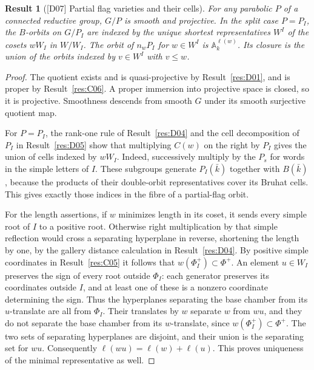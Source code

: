 \documentclass[11pt,a4paper,openany,oneside]{book}
\theoremstyle{resultstyle}
\newtheorem{statement}{Result}[chapter]
\newenvironment{result}[2]{\clubpenalty=10000\begin{statement}[\textnormal{[#1]} #2]\leavevmode\label{res:#1}\ignorespaces}{\end{statement}}
\theoremstyle{definition}
\numberwithin{equation}{chapter}
\begin{document}
\begin{result}{D07}{Partial flag varieties and their cells}
For any parabolic \(P\) of a connected reductive group, \(G/P\) is smooth and projective. In the split case \(P=P_I\), the \(B\)-orbits on \(G/P_I\) are indexed by the unique shortest representatives \(W^I\) of the cosets \(wW_I\) in \(W/W_I\). The orbit of \(n_wP_I\) for \(w\in W^I\) is \(\mathbb A_k^{\ell(w)}\). Its closure is the union of the orbits indexed by \(v\in W^I\) with \(v\le w\).
\end{result}

\begin{proof}
The quotient exists and is quasi-projective by
Result~\ref{res:D01}, and is proper by Result~\ref{res:C06}.
A proper immersion into projective space is closed, so it is
projective. Smoothness descends from smooth \(G\) under its
smooth surjective quotient map.

For \(P=P_I\), the rank-one rule of Result~\ref{res:D04}
and the cell decomposition of \(P_I\) in Result~\ref{res:D05}
show that multiplying \(C(w)\) on the right by \(P_I\)
gives the union of cells indexed by \(wW_I\).
Indeed, successively multiply by the \(P_s\) for words in
the simple letters of \(I\). These subgroups generate
\(P_I(\bar k)\) together with \(B(\bar k)\), because
the products of their double-orbit representatives cover its
Bruhat cells. This gives exactly those indices in the fibre of
a partial-flag orbit.

For the length assertions, if \(w\) minimizes length in its
coset, it sends every simple root of \(I\) to a positive root.
Otherwise right multiplication by that simple reflection
would cross a separating hyperplane in reverse, shortening
the length by one, by the gallery distance calculation
in Result~\ref{res:D04}. By positive simple coordinates in
Result~\ref{res:C05} it follows that \(w(\Phi_I^+)\subset
\Phi^+\). An element \(u\in W_I\) preserves the sign of
every root outside \(\Phi_I\): each generator preserves
its coordinates outside \(I\), and at least one of these
is a nonzero coordinate determining the sign. Thus the
hyperplanes separating the base chamber from its \(u\)-translate
are all from \(\Phi_I\). Their translates by \(w\) separate
\(w\) from \(wu\), and they do not separate the base chamber
from its \(w\)-translate, since \(w(\Phi_I^+)\subset\Phi^+\).
The two sets of separating hyperplanes are disjoint, and
their union is the separating set for \(wu\).
Consequently \(\ell(wu)=\ell(w)+\ell(u)\). This proves
uniqueness of the minimal representative as well.


\end{proof}
\end{document}
